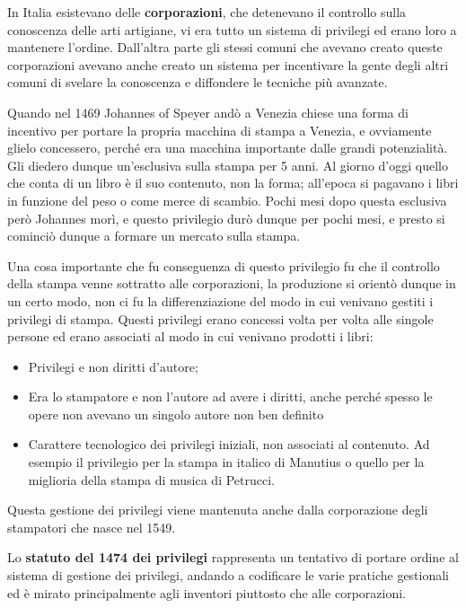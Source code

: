 In Italia esistevano delle \textbf{corporazioni}, che detenevano il controllo sulla conoscenza delle arti artigiane, vi era tutto un sistema di privilegi ed erano loro a mantenere l'ordine.
Dall'altra parte gli stessi comuni che avevano creato queste corporazioni avevano anche creato un sistema per incentivare la gente degli altri comuni di svelare la conoscenza e diffondere le tecniche più avanzate. 

Quando nel 1469 Johannes of Speyer andò a Venezia chiese una forma di incentivo per portare la propria macchina di stampa a Venezia, e ovviamente glielo concessero, perché era una macchina importante dalle grandi potenzialità. Gli diedero dunque un'esclusiva sulla stampa per 5 anni. 
Al giorno d'oggi quello che conta di un libro è il suo contenuto, non la forma; all'epoca si pagavano i libri in funzione del peso o come merce di scambio. Pochi mesi dopo questa esclusiva però Johannes morì, e questo privilegio durò dunque per pochi mesi, e presto si cominciò dunque a formare un mercato sulla stampa. 

Una cosa importante che fu conseguenza di questo privilegio fu che il controllo della stampa venne sottratto alle corporazioni, la produzione si orientò dunque in un certo modo, non ci fu la differenziazione del modo in cui venivano gestiti i privilegi di stampa. Questi privilegi erano concessi volta per volta alle singole persone ed erano associati al modo in cui venivano prodotti i libri:

\begin{itemize}

\item Privilegi e non diritti d'autore; 
\item Era lo stampatore e non l'autore ad avere i diritti, anche perché spesso le opere non avevano un singolo autore non ben definito
\item Carattere tecnologico dei privilegi iniziali, non associati al contenuto. Ad esempio il privilegio per la stampa in italico di Manutius o quello per la miglioria della stampa di musica di Petrucci.

\end{itemize}

Questa gestione dei privilegi viene mantenuta anche dalla corporazione degli stampatori che nasce nel 1549.

Lo \textbf{statuto del 1474 dei privilegi} rappresenta un tentativo di portare ordine al sistema di gestione dei privilegi, andando a codificare le varie pratiche gestionali ed è mirato principalmente agli inventori piuttosto che alle corporazioni.

